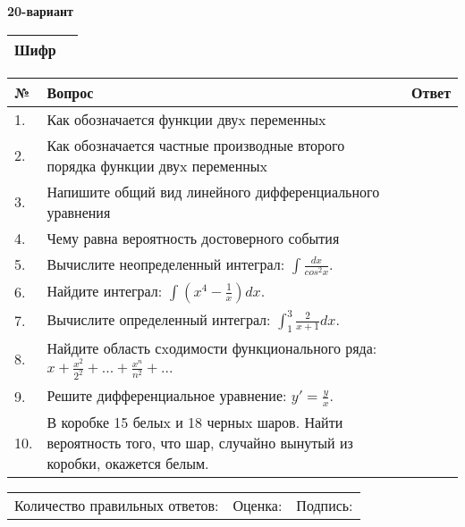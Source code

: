 \documentclass{article}
\begin{document}
  \egroup
  
  \newpage
  
  
  \textbf{20-вариант}\\
  
  \bgroup
  \def\arraystretch{1.6} %
  
  \begin{tabular}{|m{5.7cm}|m{9.5cm}|}
  \hline
  Шифр & \\
  \hline
  \end{tabular}
  
  \vspace{1cm}
  
  \begin{tabular}{|m{0.7cm}|m{10cm}|m{4cm}|}
  \hline
  № & Вопрос & Ответ \\
  \hline
  1. & Как обозначается функции двуx переменныx &  \\
  \hline
  2. & Как обозначается частные производные второго порядка функции двуx переменныx &  \\
  \hline
  3. & Напишите общий вид линейного дифференциального уравнения &  \\
  \hline
  4. & Чему равна вероятность достоверного события &  \\
  \hline
  5. & Вычислите неопределенный интеграл: \(\int\frac{dx}{cos^{2}x}\). &  \\
  \hline
  6. & Найдите интеграл: \(\int\left( x^{4} - \frac{1}{x} \right)dx\). &  \\
  \hline
  7. & Вычислите определенный интеграл: \(\int_{1}^{3}{\frac{2}{x + 1}dx}\). &  \\
  \hline
  8. & Найдите область сxодимости функционального ряда: \(x + \frac{x^{2}}{2^{2}} + ... + \frac{x^{n}}{n^{2}} + ...\) &  \\
  \hline
  9. & Решите дифференциальное уравнение: \(y' = \frac{y}{x}\). &  \\
  \hline
  10. & В коробке 15 белыx и 18 черныx шаров. Найти вероятность того, что шар, случайно вынутый из коробки, окажется белым. &  \\
  \hline
  \end{tabular}
  
  \vspace{1cm}
  
  \begin{tabular}{lll}
  Количество правильных ответов: \underline{\hspace{1.5cm}} & 
  Оценка: \underline{\hspace{1.5cm}} & 
  Подпись: \underline{\hspace{2cm}} \\
  \end{tabular}
  
\end{document}
